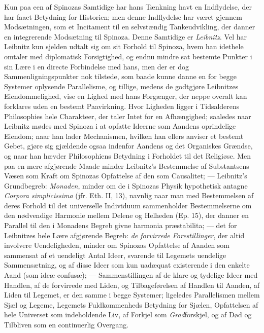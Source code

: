 \documentclass[12pt,a4paper]{book}
\newcommand{\opage}[1]{\marginnote{\footnotesize\textit{[#1]}}}
\begin{document}
Kun paa een af Spinozas Samtidige har hans Tænkning
havt en Indflydelse, der har faaet Betydning for Historien;
men denne Indflydelse har været gjennem Modsætningen,
som et Incitament til en selvstændig Tankeudvikling, der
danner en integrerende Modsætning til Spinoza. Denne
Samtidige er \emph{Leibnitz}. Vel har Leibnitz kun sjelden udtalt
sig om sit Forhold til Spinoza, hvem han idethele omtaler
med diplomatisk Forsigtighed, og endnu mindre sat
bestemte Punkter i sin Lære i en directe Forbindelse med
hans, men der er dog Sammenligningspunkter nok tilstede,
som baade kunne danne en for begge Systemer oplysende
Parallelisme, og tillige, medens de godtgjøre Leibnitzes Eiendommelighed,
vise en Lighed med hans Forgænger, der
neppe overalt kan forklares uden en bestemt Paavirkning.
Hvor Ligheden ligger i Tidsalderens Philosophies hele Charakteer,
der taler Intet for en Afhængighed; saaledes naar
Leibnitz mødes med Spinoza i at opfatte Ideerne som Aandens
oprindelige Eiendom; naar han lader Mechanismen,
\opage{184} hvilken han ellers anviser et bestemt Gebet, gjøre sig
gjældende ogsaa indenfor Aandens og det Organiskes Grændse,
og naar han hævder Philosophiens Betydning i Forholdet
til det Religiøse. Men paa en mere afgjørende Maade
minder Leibnitz's Bestemmelse af Substantsens Væsen som
Kraft om Spinozas Opfattelse af den som Causalitet; ---
Leibnitz's Grundbegreb: \emph{Monaden}, minder om de i Spinozas
Physik hypothetisk antagne \emph{Corpora simplicissima}
(jfr. Eth. II, 13), navnlig naar man med Bestemmelsen af
deres Forhold til det universelle Individuum sammenholder
Bestemmelserne om den nødvendige Harmonie mellem Delene
og Helheden (Ep. 15), der danner en Parallel til den i Monadens
Begreb givne harmonia præstabilita; --- det for Leibnitzes
hele Lære afgjørende Begreb: \emph{de forvirrede Forestillinger},
der altid involvere Uendeligheden, minder om
Spinozas Opfattelse af Aanden som sammensat af et uendeligt
Antal Ideer, svarende til Legemets uendelige Sammensætning,
og af disse Ideer som kun uadæquat existerende i
den enkelte Aand (som ideæ confusæ); --- Sammenstillingen
af de klare og tydelige Ideer med Handlen, af de forvirrede
med Liden, og Tilbageførelsen af Handlen til Aanden, af
Liden til Legemet, er den samme i begge Systemer; ligeledes
Parallelismen mellem Sjæl og Legeme, Legemets Fuldkommenheds
Betydning for Sjælen, Opfattelsen af hele Universet
som indeholdende Liv, af Forkjel som \emph{Grad}forskjel,
og af Død og Tilbliven som en continuerlig Overgang.
\end{document}
